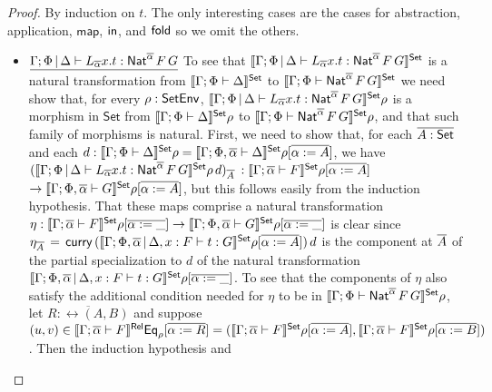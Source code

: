 \documentclass[acmsmall,review,anonymous]{acmart}
\theoremstyle{definition}
\newcommand{\set}{\mathsf{Set}}
\newcommand{\map}{\mathsf{map}}
\begin{document}
\begin{proof}
By induction on $t$. The only interesting cases are the cases for
abstraction, application, $\map$, $\mathsf{in}$, and $\mathsf{fold}$ so we omit the
others.   
\begin{itemize}
\item  $\underline{\Gamma;\Phi \,|\, \Delta \vdash L_{\overline{\alpha}}
  x.t : \mathsf{Nat}^{\overline{\alpha}} \,F \,G}$ \;
  To see that $\setsem{\Gamma;\Phi
    \,|\, \Delta \vdash L_{\overline{\alpha}} x.t :
    \Nat^{\overline{\alpha}} \,F \,G}$ is a natural transformation
  from $\setsem{\Gamma;\Phi \vdash \Delta}$ to
  $\setsem{\Gamma;\Phi \vdash \Nat^{\overline{\alpha}} \,F \,G}$
  we need show that, for every $\rho : \mathsf{SetEnv}$,
  $\setsem{\Gamma;\Phi \,|\, \Delta \vdash L_{\overline{\alpha}}
    x.t : \Nat^{\overline{\alpha}} \,F \,G}\rho$ is a morphism in
  $\set$ from $\setsem{\Gamma; \Phi \vdash \Delta}\rho$ to
  $\setsem{\Gamma; \Phi \vdash \Nat^{\overline{\alpha}} \,F
    \,G}\rho$, and that such family of morphisms is natural.
  First, we need to show that, for each $\ol{A : \set}$ and each $d :
  \setsem{\Gamma;\Phi \vdash \Delta}\rho = \setsem{\Gamma;
    \Phi, \ol{\alpha} \vdash \Delta}\rho[\overline{\alpha := A}]$, we have
  $(\setsem{\Gamma;\Phi \,|\, \Delta \vdash L_{\overline{\alpha}}
    x.t : \Nat^{\overline{\alpha}} \,F \,G}\rho\,d)_{\ol{A}}$ $:
  \setsem{\Gamma; \ol{\alpha} \vdash F}\rho[\overline{\alpha := A}]$
  $\to \setsem{\Gamma; \Phi, \ol{\alpha} \vdash G}\rho[\overline{\alpha :=
      A}]$, but this follows easily from the induction hypothesis.
That these maps comprise a natural transformation $\eta :
\setsem{\Gamma; \ol{\alpha} \vdash F}\rho[\overline{\alpha := \_}] \to
\setsem{\Gamma; \Phi, \ol{\alpha} \vdash G}\rho[\overline{\alpha := \_}]$ is
clear since $\eta_{\ol{A}} \, = \, \curry\,
(\setsem{\Gamma;\Phi,\overline{\alpha} \,|\, \Delta, x : F \vdash t:
  G}\rho[\overline{\alpha := A}])\,d$ is the component at $\overline{A}$ of
the partial specialization to $d$ of the natural transformation
$\setsem{\Gamma;\Phi,\overline{\alpha} \,|\, \Delta, x : F \vdash t:
  G}\rho[\overline{\alpha := \_}]$.  To see that the components of
$\eta$ also satisfy the additional condition needed for $\eta$ to
be in $\setsem{\Gamma;\Phi \vdash \Nat^{\overline{\alpha}} \,F
  \,G}\rho$, let $\overline{R : \rel(A, B)}$ and suppose $(u, v) \in
\relsem{\Gamma;\overline{\alpha} \vdash F} \Eq_{\rho}[\overline{\alpha
    := R}] = (\setsem{\Gamma;\overline{\alpha} \vdash F}
\rho[\overline{\alpha := A}], \setsem{\Gamma;\overline{\alpha} \vdash
  F} \rho[\overline{\alpha := B}])$. Then the induction hypothesis and

\end{itemize}
\end{proof}
\end{document}

